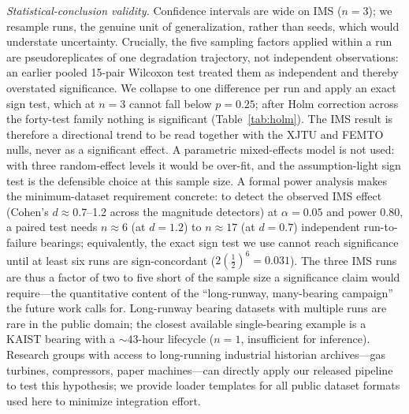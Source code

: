 \documentclass[IJPHM, 2026, 0]{PHMSociety}
\begin{document}
\emph{Statistical-conclusion validity.} Confidence intervals are wide on IMS ($n=3$); we resample runs, the genuine unit of generalization, rather than seeds, which would understate uncertainty. Crucially, the five sampling factors applied within a run are pseudoreplicates of one degradation trajectory, not independent observations: an earlier pooled 15-pair Wilcoxon test treated them as independent and thereby overstated significance. We collapse to one difference per run and apply an exact sign test, which at $n=3$ cannot fall below $p=0.25$; after Holm correction across the forty-test family nothing is significant (Table~\ref{tab:holm}). The IMS result is therefore a directional trend to be read together with the XJTU and FEMTO nulls, never as a significant effect. A parametric mixed-effects model is not used: with three random-effect levels it would be over-fit, and the assumption-light sign test is the defensible choice at this sample size. A formal power analysis makes the minimum-dataset requirement concrete: to detect the observed IMS effect (Cohen's $d \approx 0.7$--1.2 across the magnitude detectors) at $\alpha=0.05$ and power 0.80, a paired test needs $n \approx 6$ (at $d=1.2$) to $n \approx 17$ (at $d=0.7$) independent run-to-failure bearings; equivalently, the exact sign test we use cannot reach significance until at least six runs are sign-concordant ($2(\tfrac{1}{2})^6=0.031$). The three IMS runs are thus a factor of two to five short of the sample size a significance claim would require---the quantitative content of the ``long-runway, many-bearing campaign'' the future work calls for. Long-runway bearing datasets with multiple runs are rare in the public domain; the closest available single-bearing example is a KAIST bearing with a ${\sim}43$-hour lifecycle ($n=1$, insufficient for inference). Research groups with access to long-running industrial historian archives---gas turbines, compressors, paper machines---can directly apply our released pipeline to test this hypothesis; we provide loader templates for all public dataset formats used here to minimize integration effort.
\end{document}
